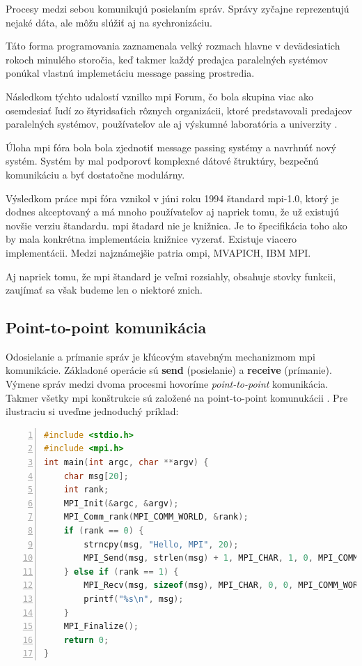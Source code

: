 Procesy medzi sebou komunikujú posielaním správ.
Správy zyčajne reprezentujú nejaké dáta, ale môžu slúžiť aj na sychronizáciu.

Táto forma programovania zaznamenala velký rozmach hlavne v devädesiatich rokoch minulého storočia,
keď takmer každý predajca paralelných systémov ponúkal vlastnú implemetáciu message passing prostredia.

Následkom týchto udalostí vznilko \acrfull{mpi} Forum, čo bola skupina viac ako osemdesiať ľudí zo štyridsaťich rôznych organizácii,
ktoré predstavovali predajcov paralelných systémov, používateľov ale aj výskumné laboratória a univerzity \cite{mpibook}.

Úloha \acrshort{mpi} fóra bola bola zjednotiť message passing systémy a navrhnúť nový systém.
Systém by mal podporovť komplexné dátové štruktúry, bezpečnú komunikáciu a byť dostatočne modulárny.

Výsledkom práce \acrshort{mpi} fóra vznikol v júni roku 1994 štandard \acrshort{mpi}-1.0,
ktorý je dodnes akceptovaný a má mnoho používateľov aj napriek tomu, že už existujú novšie verziu štandardu.
\acrshort{mpi} štadard nie je knižnica. Je to špecifikácia toho ako by mala konkrétna implementácia knižnice vyzerať.
Existuje viacero implementácii. Medzi najznámejšie patria \acrshort{ompi}, MVAPICH, IBM MPI.

Aj napriek tomu, že \acrshort{mpi} štandard je veľmi rozsiahly, obsahuje stovky funkcii, zaujímať sa však budeme len o niektoré znich.

\subsection{Point-to-point komunikácia}
Odosielanie a prímanie správ je kľúcovým stavebným mechanizmom \acrshort{mpi} komunikácie.
Základoné operácie sú \textbf{send} (posielanie) a \textbf{receive} (prímanie).
Výmene správ medzi dvoma procesmi hovoríme \textit{point-to-point} komunikácia.
Takmer všetky \acrshort{mpi} konštrukcie sú založené na point-to-point komunukácii \cite{mpi3-1}.
Pre ilustraciu si uveďme jednoduchý príklad:

\begin{lstlisting}[language=c, caption={Point-to-point komunikácia}, label={mpi:1}, numbers=left]
#include <stdio.h>
#include <mpi.h>
int main(int argc, char **argv) {
    char msg[20];
    int rank;
    MPI_Init(&argc, &argv);
    MPI_Comm_rank(MPI_COMM_WORLD, &rank);
    if (rank == 0) {
        strncpy(msg, "Hello, MPI", 20);
        MPI_Send(msg, strlen(msg) + 1, MPI_CHAR, 1, 0, MPI_COMM_WORLD);
    } else if (rank == 1) {
        MPI_Recv(msg, sizeof(msg), MPI_CHAR, 0, 0, MPI_COMM_WORLD, MPI_STATUS_IGNORE);
        printf("%s\n", msg);
    }
    MPI_Finalize();
    return 0;
}
\end{lstlisting}

